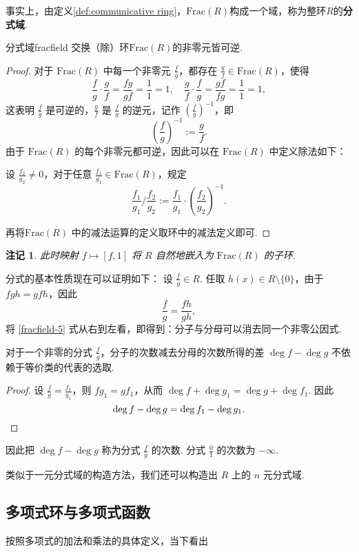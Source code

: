 \documentclass[12pt, a4paper]{ctexart}
\newtheorem*{remark}{{\color{red}\dbend}\textbf{注记}}
\begin{document}
事实上，由定义\ref{def:communicative ring}，$\text{Frac}(R)$构成一个域，称为整环$R$的\textbf{分式域}. 
\begin{proposition}{分式域}{fracfield}
	交换（除）环$\text{Frac}(R)$的非零元皆可逆. 
\end{proposition}
\begin{proof}
	对于 $ \text{Frac}(R) $ 中每一个非零元 $ \frac{f}{g} $，都存在 $ \frac{g}{f} \in \text{Frac}(R) $，使得
	\[
	\frac{f}{g} \cdot \frac{g}{f} = \frac{fg}{gf} = \frac{1}{1} = 1, \quad \frac{g}{f} \cdot \frac{f}{g} = \frac{gf}{fg} = \frac{1}{1} = 1,
	\]
	这表明 $ \frac{f}{g} $ 是可逆的，$ \frac{g}{f} $ 是 $ \frac{f}{g} $ 的逆元，记作 $ \left( \frac{f}{g} \right)^{-1} $，即
	\[
	\left( \frac{f}{g} \right)^{-1} := \frac{g}{f}.
	\]
	由于 $ \text{Frac}(R) $ 的每个非零元都可逆，因此可以在 $ \text{Frac}(R) $ 中定义除法如下：
	
	设 $ \frac{f_2}{g_2} \neq 0 $，对于任意 $ \frac{f_1}{g_1} \in \text{Frac}(R) $，规定
	\[
	\frac{f_1}{g_1} \bigg/ \frac{f_2}{g_2} := \frac{f_1}{g_1} \cdot \left( \frac{f_2}{g_2} \right)^{-1}.
	\]
	
	再将$ \text{Frac}(R) $ 中的减法运算的定义取环中的减法定义即可. 
\end{proof}
\begin{remark}
	此时映射 $f \mapsto [f, 1]$ 将 $R$ 自然地嵌入为 $ \text{Frac}(R)$ 的子环. 
\end{remark}
分式的基本性质现在可以证明如下：
设 $\frac{f}{g} \in R$. 任取 $h(x) \in R\setminus\{0\}$，由于 $ fgh = gfh $，因此\begin{equation}\label{fracfield-5}
	\frac{f}{g} = \frac{fh}{gh},
\end{equation}
将 \eqref{fracfield-5} 式从右到左看，即得到：分子与分母可以消去同一个非零公因式. 
\begin{lemma}{}{}
	对于一个非零的分式 $\frac{f}{g}$，分子的次数减去分母的次数所得的差 $\deg f - \deg g$ 不依赖于等价类的代表的选取. 
\end{lemma}
\begin{proof}
	设 $\frac{f}{g} = \frac{f_1}{g_1}$，则 $fg_1 = gf_1$，从而 $\deg f + \deg g_1 = \deg g + \deg f_1$. 因此
	\[
		\deg f - \deg g = \deg f_1 - \deg g_1. \qedhere
	\]
\end{proof}
因此把 $\deg f - \deg g$ 称为分式 $\frac{f}{g}$ 的次数. 分式 $\frac{0}{1}$ 的次数为 $-\infty$. 

类似于一元分式域的构造方法，我们还可以构造出 $R$ 上的 $n$ 元分式域. 
\subsection{多项式环与多项式函数}
按照多项式的加法和乘法的具体定义，当下看出
\end{document}
